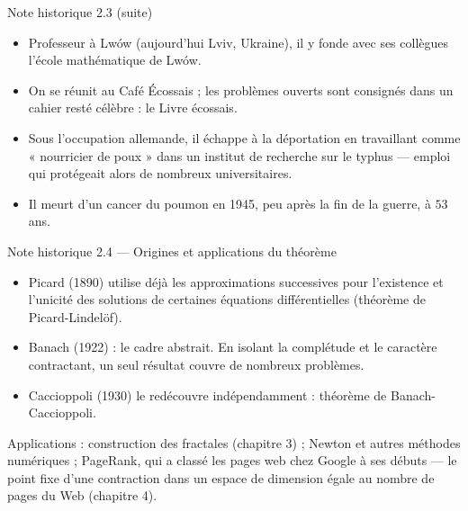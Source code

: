\begin{frame}{Note historique 2.3 (suite)}
  \small
  \begin{itemize}
    \item Professeur à Lwów (aujourd'hui Lviv, Ukraine), il y fonde avec
      ses collègues l'école mathématique de Lwów.
    \item On se réunit au Café Écossais ; les problèmes ouverts
      sont consignés dans un cahier resté célèbre : le Livre
      écossais.
    \item Sous l'occupation allemande, il échappe à la déportation en
      travaillant comme « nourricier de poux » dans un institut de
      recherche sur le typhus --- emploi qui protégeait alors de
      nombreux universitaires.
    \item Il meurt d'un cancer du poumon en 1945, peu après la fin de la
      guerre, à $53$ ans.
  \end{itemize}
\end{frame}

\begin{frame}{Note historique 2.4 --- Origines et applications du théorème}
  \small
  \begin{itemize}
    \item Picard (1890) utilise déjà les approximations
      successives pour l'existence et l'unicité des solutions de
      certaines équations différentielles (théorème de
      Picard-Lindelöf).
    \item Banach (1922) : le cadre abstrait. En isolant
      la complétude et le caractère contractant, un seul résultat
      couvre de nombreux problèmes.
    \item Caccioppoli (1930) le redécouvre indépendamment :
      théorème de Banach-Caccioppoli.
  \end{itemize}
  \vspace{4pt}
  Applications : construction des fractales (chapitre 3) ;
  Newton et autres méthodes numériques ; PageRank, qui a classé
  les pages web chez Google à ses débuts --- le point fixe d'une
  contraction dans un espace de dimension égale au nombre de pages du
  Web (chapitre 4).
\end{frame}
